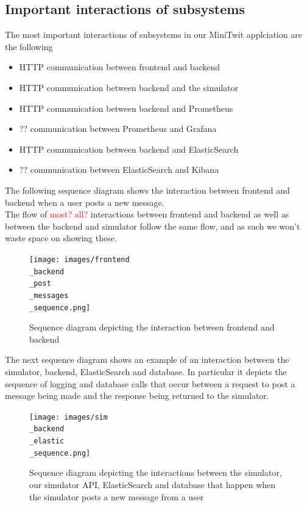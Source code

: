 \subsection{Important interactions of subsystems}
The most important interactions of subsystems in our MiniTwit applciation are the following 
\begin{itemize}
    \item HTTP communication between frontend and backend
    \item HTTP communication between backend and the simulator
    \item HTTP communication between backend and Prometheus
    \item ?? communication between Prometheus and Grafana
    \item HTTP communication between backend and ElasticSearch
    \item ?? communication between ElasticSearch and Kibana
\end{itemize}

The following sequence diagram shows the interaction between frontend and backend when a user posts a new message. \\
The flow of \textcolor{red}{most? all?} interactions between frontend and backend as well as between the backend and simulator follow the same flow, and as such we won't waste space on showing these. 

\begin{figure}[H]
 \centering
 \texttt{[image: images/frontend\\\_backend\\\_post\\\_messages\\\_sequence.png]}
 \caption{Sequence diagram depicting the interaction between frontend and backend}
 \label{fig:SequenceDiagramPostMessage}
\end{figure}

The next sequence diagram shows an example of an interaction between the simulator, backend, ElasticSearch and database. In particular it depicts the sequence of logging and database calls that occur between a request to post a message being made and the response being returned to the simulator.

\begin{figure}[H]
 \centering
 \texttt{[image: images/sim\\\_backend\\\_elastic\\\_sequence.png]}
 \caption{Sequence diagram depicting the interactions between the simulator, our simulator API, ElasticSearch and database that happen when the simulator posts a new message from a user}
 \label{fig:SequenceDiagramElasticBackendSim}
\end{figure}


